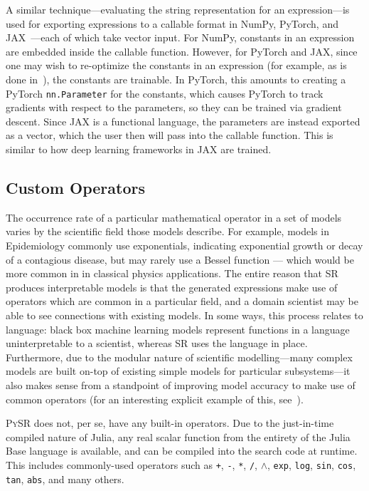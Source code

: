 \documentclass[letterpaper,twocolumn]{scrartcl}
\newcommand\pysr{\textsc{PySR}\xspace}
\begin{document}
A similar technique---evaluating the string representation for an expression---is used for exporting expressions to a callable format in NumPy, PyTorch, and JAX~\cite{numpy,torch,jax}---each of which take vector input.
For NumPy, constants in an expression are embedded inside the callable function.
However, for PyTorch and JAX, since one may wish to re-optimize the constants in an expression (for example, as is done in~\cite{lemosRediscoveringNewtonGravity2022}), the constants are trainable.
In PyTorch, this amounts to creating a PyTorch \texttt{nn.Parameter} for the constants, which causes PyTorch to track gradients with respect to the parameters, so they can be trained via gradient descent.
Since JAX is a functional language, the parameters are instead exported as a vector, which the user then will pass into the callable function.
This is similar to how deep learning frameworks in JAX are trained.

\subsection{Custom Operators}
\label{sec:custom_operators}

The occurrence rate of a particular mathematical operator in a set of models varies by the scientific field those models describe.
For example, models in Epidemiology commonly use exponentials, indicating exponential growth or decay of a contagious disease, but may rarely use a Bessel function — which would be more common in in classical physics applications.
The entire reason that SR produces interpretable models is that the generated expressions make use of operators which are common in a particular field, and a domain scientist may be able to see connections with existing models.
In some ways, this process relates to language: black box machine learning models represent functions in a language uninterpretable to a scientist, whereas SR uses the language in place.
Furthermore, due to the modular nature of scientific modelling---many complex models are built on-top of existing simple models for particular subsystems---it also makes sense from a standpoint of improving model accuracy to make use of common operators (for an interesting explicit example of this, see~\cite{guimeraBayesianMachineScientist2020}).

\pysr does not, per se, have any built-in operators.
Due to the just-in-time compiled nature of Julia, any real scalar function from the entirety of the Julia Base language is available, and can be compiled into the search code at runtime.
This includes commonly-used operators such as
\texttt{+},
\texttt{-},
\texttt{*},
\texttt{/},
$\wedge$,
\texttt{exp},
\texttt{log},
\texttt{sin},
\texttt{cos},
\texttt{tan},
\texttt{abs},
and many others.
\end{document}
